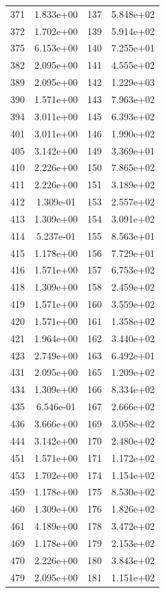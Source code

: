 \documentclass[12pt]{article}
\begin{document}
\begin{longtable}{@{}cccc@{}}
371 & 1.833e+00 & 137 & 5.848e+02 \\
372 & 1.702e+00 & 139 & 5.914e+02 \\
375 & 6.153e+00 & 140 & 7.255e+01 \\
382 & 2.095e+00 & 141 & 4.555e+02 \\
389 & 2.095e+00 & 142 & 1.229e+03 \\
390 & 1.571e+00 & 143 & 7.963e+02 \\
394 & 3.011e+00 & 145 & 6.393e+02 \\
401 & 3.011e+00 & 146 & 1.990e+02 \\
405 & 3.142e+00 & 149 & 3.369e+01 \\
410 & 2.226e+00 & 150 & 7.865e+02 \\
411 & 2.226e+00 & 151 & 3.189e+02 \\
412 & 1.309e-01 & 153 & 2.557e+02 \\
413 & 1.309e+00 & 154 & 3.091e+02 \\
414 & 5.237e-01 & 155 & 8.563e+01 \\
415 & 1.178e+00 & 156 & 7.729e+01 \\
416 & 1.571e+00 & 157 & 6.753e+02 \\
418 & 1.309e+00 & 158 & 2.459e+02 \\
419 & 1.571e+00 & 160 & 3.559e+02 \\
420 & 1.571e+00 & 161 & 1.358e+02 \\
421 & 1.964e+00 & 162 & 3.440e+02 \\
423 & 2.749e+00 & 163 & 6.492e+01 \\
431 & 2.095e+00 & 165 & 1.209e+02 \\
434 & 1.309e+00 & 166 & 8.334e+02 \\
435 & 6.546e-01 & 167 & 2.666e+02 \\
436 & 3.666e+00 & 169 & 3.058e+02 \\
444 & 3.142e+00 & 170 & 2.480e+02 \\
451 & 1.571e+00 & 171 & 1.172e+02 \\
453 & 1.702e+00 & 174 & 1.154e+02 \\
459 & 1.178e+00 & 175 & 8.530e+02 \\
460 & 1.309e+00 & 176 & 1.826e+02 \\
461 & 4.189e+00 & 178 & 3.472e+02 \\
469 & 1.178e+00 & 179 & 2.153e+02 \\
470 & 2.226e+00 & 180 & 3.843e+02 \\
479 & 2.095e+00 & 181 & 1.151e+02 \\

\end{longtable}
\end{document}
